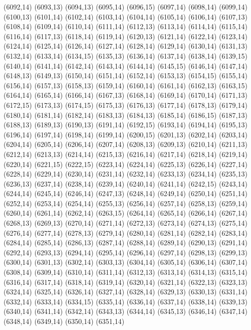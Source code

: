 (6092,14)
(6093,13)
(6094,13)
(6095,14)
(6096,15)
(6097,14)
(6098,14)
(6099,14)
(6100,13)
(6101,14)
(6102,14)
(6103,14)
(6104,14)
(6105,14)
(6106,14)
(6107,13)
(6108,14)
(6109,14)
(6110,14)
(6111,14)
(6112,13)
(6113,14)
(6114,14)
(6115,14)
(6116,14)
(6117,13)
(6118,14)
(6119,14)
(6120,13)
(6121,14)
(6122,14)
(6123,14)
(6124,14)
(6125,14)
(6126,14)
(6127,14)
(6128,14)
(6129,14)
(6130,14)
(6131,13)
(6132,14)
(6133,14)
(6134,15)
(6135,13)
(6136,14)
(6137,14)
(6138,14)
(6139,15)
(6140,14)
(6141,14)
(6142,14)
(6143,14)
(6144,14)
(6145,15)
(6146,14)
(6147,14)
(6148,13)
(6149,13)
(6150,14)
(6151,14)
(6152,14)
(6153,13)
(6154,15)
(6155,14)
(6156,14)
(6157,13)
(6158,13)
(6159,14)
(6160,14)
(6161,14)
(6162,13)
(6163,15)
(6164,14)
(6165,14)
(6166,14)
(6167,13)
(6168,14)
(6169,14)
(6170,14)
(6171,13)
(6172,15)
(6173,13)
(6174,15)
(6175,13)
(6176,13)
(6177,14)
(6178,13)
(6179,14)
(6180,14)
(6181,14)
(6182,14)
(6183,13)
(6184,13)
(6185,14)
(6186,15)
(6187,13)
(6188,13)
(6189,13)
(6190,13)
(6191,14)
(6192,15)
(6193,14)
(6194,14)
(6195,13)
(6196,14)
(6197,14)
(6198,14)
(6199,14)
(6200,15)
(6201,13)
(6202,14)
(6203,14)
(6204,14)
(6205,14)
(6206,14)
(6207,14)
(6208,13)
(6209,13)
(6210,14)
(6211,13)
(6212,14)
(6213,13)
(6214,14)
(6215,13)
(6216,14)
(6217,14)
(6218,14)
(6219,14)
(6220,14)
(6221,15)
(6222,15)
(6223,14)
(6224,14)
(6225,13)
(6226,14)
(6227,14)
(6228,14)
(6229,14)
(6230,14)
(6231,14)
(6232,14)
(6233,13)
(6234,14)
(6235,13)
(6236,13)
(6237,14)
(6238,14)
(6239,14)
(6240,14)
(6241,14)
(6242,15)
(6243,14)
(6244,14)
(6245,14)
(6246,14)
(6247,13)
(6248,14)
(6249,14)
(6250,14)
(6251,14)
(6252,14)
(6253,14)
(6254,14)
(6255,13)
(6256,14)
(6257,14)
(6258,13)
(6259,14)
(6260,14)
(6261,14)
(6262,14)
(6263,15)
(6264,14)
(6265,14)
(6266,14)
(6267,14)
(6268,13)
(6269,13)
(6270,14)
(6271,14)
(6272,13)
(6273,14)
(6274,13)
(6275,14)
(6276,14)
(6277,14)
(6278,13)
(6279,14)
(6280,14)
(6281,14)
(6282,14)
(6283,14)
(6284,14)
(6285,14)
(6286,13)
(6287,14)
(6288,14)
(6289,14)
(6290,13)
(6291,14)
(6292,14)
(6293,13)
(6294,14)
(6295,14)
(6296,14)
(6297,14)
(6298,13)
(6299,13)
(6300,14)
(6301,13)
(6302,14)
(6303,13)
(6304,14)
(6305,14)
(6306,14)
(6307,14)
(6308,14)
(6309,14)
(6310,14)
(6311,14)
(6312,13)
(6313,14)
(6314,13)
(6315,14)
(6316,14)
(6317,14)
(6318,14)
(6319,14)
(6320,14)
(6321,14)
(6322,13)
(6323,13)
(6324,14)
(6325,14)
(6326,14)
(6327,14)
(6328,14)
(6329,13)
(6330,13)
(6331,14)
(6332,14)
(6333,14)
(6334,15)
(6335,14)
(6336,14)
(6337,14)
(6338,14)
(6339,13)
(6340,14)
(6341,14)
(6342,14)
(6343,13)
(6344,14)
(6345,13)
(6346,14)
(6347,14)
(6348,14)
(6349,14)
(6350,14)
(6351,14)
